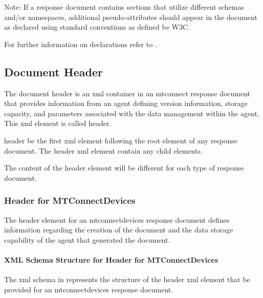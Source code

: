 \documentclass{mtconnect}	%
\begin{document}
\begin{note}
Note:	If a \gls{response document} contains sections that utilize different \glspl{schema} and/or \glspl{namespace}, additional pseudo-attributes should appear in the document as declared using standard conventions as defined be W3C.

\end{note}

For further information on declarations refer to .

\subsection{Document Header}
\label{sec:Document Header}

The \gls{document header} is an \gls{xml} container in an \gls{mtconnect response document} that provides information from an \gls{agent} defining version information, storage capacity, and parameters associated with the data management within the \gls{agent}.  This \gls{xml} element is called \gls{header}.

\gls{header} \MUST be the first \gls{xml} element following the \gls{root element} of any \gls{response document}.  The \gls{header} \gls{xml} element \MUSTNOT contain any \glspl{child element}.  

The content of the \gls{header} element will be different for each type of \gls{response document}.

\subsubsection{Header for MTConnectDevices}

The \gls{header} element for an \gls{mtconnectdevices response document} defines information regarding the creation of the document and the data storage capability of the \gls{agent} that generated the document.  

\paragraph{XML Schema Structure for Header for MTConnectDevices}\mbox{}

The \gls{xml schema} in  represents the structure of the \gls{header} \gls{xml} element that \MUST be provided for an \gls{mtconnectdevices response document}.  
\end{document}

